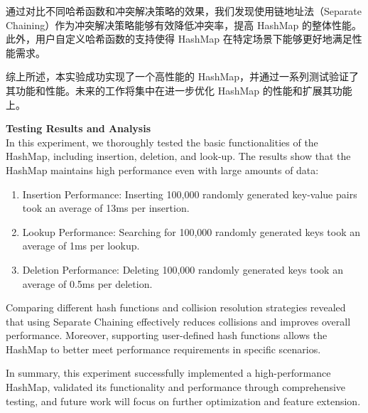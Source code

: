 \documentclass{article}
\begin{document}
    通过对比不同哈希函数和冲突解决策略的效果，我们发现使用链地址法（Separate Chaining）作为冲突解决策略能够有效降低冲突率，提高 HashMap 的整体性能。此外，用户自定义哈希函数的支持使得 HashMap 在特定场景下能够更好地满足性能需求。

    综上所述，本实验成功实现了一个高性能的 HashMap，并通过一系列测试验证了其功能和性能。未来的工作将集中在进一步优化 HashMap 的性能和扩展其功能上。

    \bigskip
    \textbf{Testing Results and Analysis}\\
    In this experiment, we thoroughly tested the basic functionalities of the HashMap, including insertion, deletion, and look-up. The results show that the HashMap maintains high performance even with large amounts of data:
    \begin{enumerate}
        \item Insertion Performance: Inserting 100,000 randomly generated key-value pairs took an average of 13ms per insertion.
        \item Lookup Performance: Searching for 100,000 randomly generated keys took an average of 1ms per lookup.
        \item Deletion Performance: Deleting 100,000 randomly generated keys took an average of 0.5ms per deletion.
    \end{enumerate}

    Comparing different hash functions and collision resolution strategies revealed that using Separate Chaining effectively reduces collisions and improves overall performance. Moreover, supporting user-defined hash functions allows the HashMap to better meet performance requirements in specific scenarios.

    In summary, this experiment successfully implemented a high-performance HashMap, validated its functionality and performance through comprehensive testing, and future work will focus on further optimization and feature extension.
\end{document}
